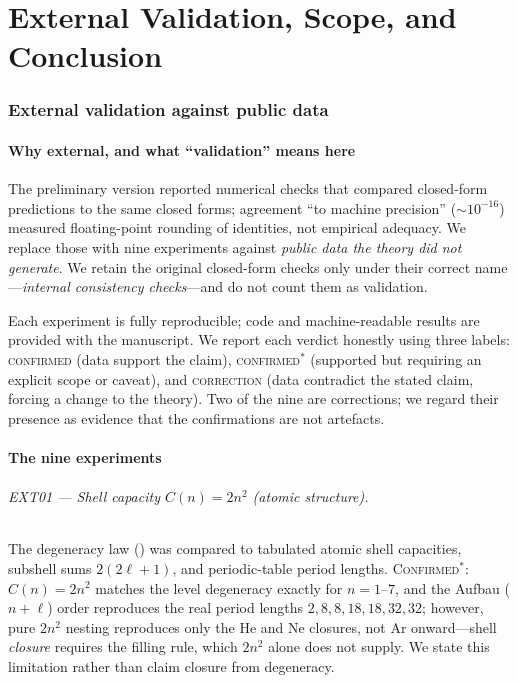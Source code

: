 \documentclass[11pt,twocolumn,a4paper]{article}
\begin{document}
\part{External Validation, Scope, and Conclusion}

\section{External validation against public data}
\label{sec:external}

\subsection{Why external, and what ``validation'' means here}

The preliminary version reported numerical checks that compared closed-form
predictions to the same closed forms; agreement ``to machine precision''
($\sim10^{-16}$) measured floating-point rounding of identities, not empirical
adequacy. We replace those with nine experiments against \emph{public data the
theory did not generate}. We retain the original closed-form checks only under
their correct name---\emph{internal consistency checks}---and do not count them
as validation.

Each experiment is fully reproducible; code and machine-readable results are
provided with the manuscript. We report each verdict honestly using three
labels: \textsc{confirmed} (data support the claim), \textsc{confirmed$^\ast$}
(supported but requiring an explicit scope or caveat), and
\textsc{correction} (data contradict the stated claim, forcing a change to the
theory). Two of the nine are corrections; we regard their presence as evidence
that the confirmations are not artefacts.

\subsection{The nine experiments}

\paragraph{EXT01 --- Shell capacity $C(n)=2n^2$ (atomic structure).}
The degeneracy law () was compared to tabulated atomic shell
capacities, subshell sums $2(2\ell+1)$, and periodic-table period lengths.
\textsc{Confirmed$^\ast$}: $C(n)=2n^2$ matches the level degeneracy exactly for
$n=1$--$7$, and the Aufbau ($n+\ell$) order reproduces the real period lengths
$2,8,8,18,18,32,32$; however, pure $2n^2$ nesting reproduces only the He and Ne
closures, not Ar onward---shell \emph{closure} requires the filling rule, which
$2n^2$ alone does not supply. We state this limitation rather than claim closure
from degeneracy.
\end{document}

